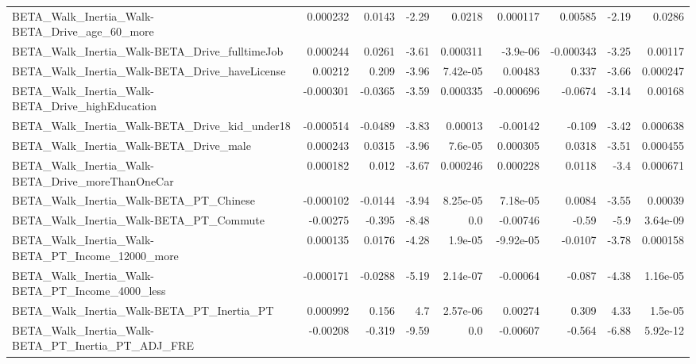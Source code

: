 \begin{tabular}{lrrrrrrrr}
BETA\_Walk\_Inertia\_Walk-BETA\_Drive\_age\_60\_more      &    0.000232 &       0.0143 &    -2.29 &   0.0218 &   0.000117 &     0.00585 &        -2.19 &        0.0286 \\
BETA\_Walk\_Inertia\_Walk-BETA\_Drive\_fulltimeJob      &    0.000244 &       0.0261 &    -3.61 & 0.000311 &   -3.9e-06 &   -0.000343 &        -3.25 &       0.00117 \\
BETA\_Walk\_Inertia\_Walk-BETA\_Drive\_haveLicense      &     0.00212 &        0.209 &    -3.96 & 7.42e-05 &    0.00483 &       0.337 &        -3.66 &      0.000247 \\
BETA\_Walk\_Inertia\_Walk-BETA\_Drive\_highEducation    &   -0.000301 &      -0.0365 &    -3.59 & 0.000335 &  -0.000696 &     -0.0674 &        -3.14 &       0.00168 \\
BETA\_Walk\_Inertia\_Walk-BETA\_Drive\_kid\_under18      &   -0.000514 &      -0.0489 &    -3.83 &  0.00013 &   -0.00142 &      -0.109 &        -3.42 &      0.000638 \\
BETA\_Walk\_Inertia\_Walk-BETA\_Drive\_male             &    0.000243 &       0.0315 &    -3.96 &  7.6e-05 &   0.000305 &      0.0318 &        -3.51 &      0.000455 \\
BETA\_Walk\_Inertia\_Walk-BETA\_Drive\_moreThanOneCar   &    0.000182 &        0.012 &    -3.67 & 0.000246 &   0.000228 &      0.0118 &         -3.4 &      0.000671 \\
BETA\_Walk\_Inertia\_Walk-BETA\_PT\_Chinese             &   -0.000102 &      -0.0144 &    -3.94 & 8.25e-05 &   7.18e-05 &      0.0084 &        -3.55 &       0.00039 \\
BETA\_Walk\_Inertia\_Walk-BETA\_PT\_Commute             &    -0.00275 &       -0.395 &    -8.48 &      0.0 &   -0.00746 &       -0.59 &         -5.9 &      3.64e-09 \\
BETA\_Walk\_Inertia\_Walk-BETA\_PT\_Income\_12000\_more   &    0.000135 &       0.0176 &    -4.28 &  1.9e-05 &  -9.92e-05 &     -0.0107 &        -3.78 &      0.000158 \\
BETA\_Walk\_Inertia\_Walk-BETA\_PT\_Income\_4000\_less    &   -0.000171 &      -0.0288 &    -5.19 & 2.14e-07 &   -0.00064 &      -0.087 &        -4.38 &      1.16e-05 \\
BETA\_Walk\_Inertia\_Walk-BETA\_PT\_Inertia\_PT          &    0.000992 &        0.156 &      4.7 & 2.57e-06 &    0.00274 &       0.309 &         4.33 &       1.5e-05 \\
BETA\_Walk\_Inertia\_Walk-BETA\_PT\_Inertia\_PT\_ADJ\_FRE  &    -0.00208 &       -0.319 &    -9.59 &      0.0 &   -0.00607 &      -0.564 &        -6.88 &      5.92e-12 \\

\end{tabular}

